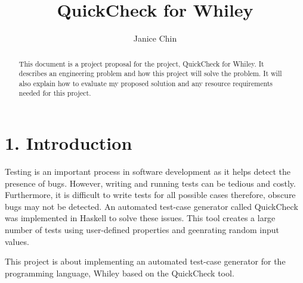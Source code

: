 \documentclass[11pt, a4paper, twoside, openright]{report}
\title{QuickCheck for Whiley}
\author{Janice Chin}
\date{}
\begin{document}
\frontmatter


\begin{abstract}
   This document is a project proposal for the project, QuickCheck for Whiley. It describes an engineering problem and how this project will solve the problem. It will also explain how to evaluate my proposed solution and any resource requirements needed for this project.
\end{abstract}


\maketitle




\mainmatter


\section*{1. Introduction}
Testing is an important process in software development as it helps detect the presence of bugs. However, writing and running tests can be tedious and costly. Furthermore, it is difficult to write tests for all possible cases therefore, obscure bugs may not be detected. An automated test-case generator called QuickCheck was implemented in Haskell to solve these issues. This tool creates a large number of tests using user-defined properties and geenrating random input values.

This project is about implementing an automated test-case generator for the programming language, Whiley based on the QuickCheck tool.

%
%
%
\end{document}
